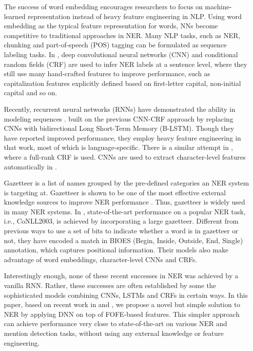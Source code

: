 \documentclass[11pt,a4paper]{article}
\begin{document}
The success of word embedding \cite{mikolov2013distributed} encourages researchers to focus on machine-learned representation instead of heavy feature engineering in NLP. Using word embedding as the typical feature representation for words, NNs become competitive to traditional approaches in NER. 
Many NLP tasks, such as NER, chunking and part-of-speech (POS) tagging can be formulated as sequence labeling tasks.
In \cite{collobert2011natural}, 
deep convolutional neural networks (CNN) and conditional random fields (CRF) are used to infer NER labels at a sentence level, where they still  use many hand-crafted features to improve performance, such as capitalization features explicitly defined based on first-letter capital, non-initial capital and so on.

Recently, recurrent neural networks (RNNs) have demonstrated the ability in modeling sequences \cite{graves2012neural}. 
 built on the previous CNN-CRF approach by replacing CNNs with bidirectional Long Short-Term Memory (B-LSTM). 
Though they have reported improved performance, they employ heavy feature engineering in that work, most of which is language-specific. There is a similar attempt in \cite{rondeau2016lstm}, where a full-rank CRF is used. 
CNNs are used to extract character-level features automatically in \cite{dos2015boosting}. 

Gazetteer is a list of names grouped by the pre-defined categories an NER system is targeting at. 
Gazetteer is shown to be one of the most effective external knowledge sources to improve NER performance \cite{tjong2003introduction}. Thus,  gazetteer is widely used in many NER systems.  
In \cite{chiu2016named}, state-of-the-art performance on a popular NER task, i.e., CoNLL2003,  is achieved by incorporating  a large gazetteer. 
Different from previous ways to use a set of bits to indicate whether a word is in gazetteer or not, 
they have encoded a match in BIOES (Begin, Inside, Outside, End, Single) annotation, 
which captures positional information. Their models also make advantage of word embeddings, character-level CNNs and CRFs. 

Interestingly enough, none of these recent successes in NER was achieved by a vanilla RNN. Rather, 
these successes are often established by some the sophisticated models combining CNNs, LSTMs and CRFs in certain ways. 
In this paper, based on recent work in  \cite{zhang2015fixed} and \cite{zhang2016compact},
we propose a novel but simple solution to NER by applying DNN on top of FOFE-based features.
This simpler approach can achieve performance very close to state-of-the-art on various NER and mention detection tasks, without using any external knowledge or feature engineering.
\end{document}
